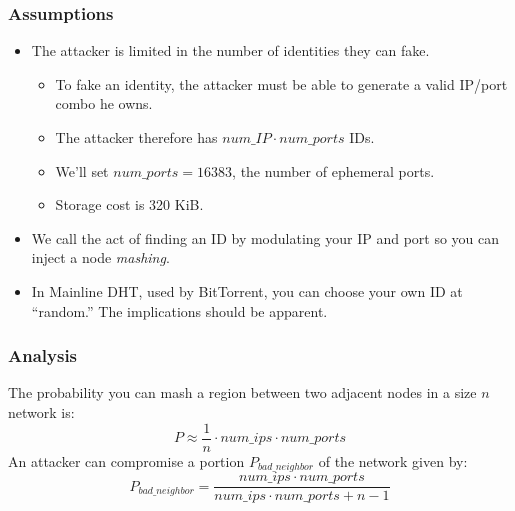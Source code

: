 \documentclass[11pt]{beamer}
\begin{document}
\begin{frame}
\frametitle{Assumptions}
	\begin{itemize}
		\item The attacker is limited in the number of identities they can fake.		
		\begin{itemize}
			\item To fake an identity, the attacker must be able to generate a valid IP/port combo he owns.
			\item The attacker therefore has $num\_IP \cdot num\_ports$ IDs.
			\item We'll set $ num\_ports = 16383 $, the number of ephemeral ports.
			\item Storage cost is 320 KiB.
		\end{itemize}
		\item We call the act of finding an ID by modulating your IP and port so you can inject a node \emph{mashing}.
		\item In Mainline DHT, used by BitTorrent, you can choose your own ID at ``random.''   The implications should be apparent.
	
	\end{itemize}
\end{frame}

\begin{frame}
    \frametitle{Analysis}
    The probability you can mash a region between two adjacent nodes in a size $n$ network is:
     \begin{equation}
    P \approx \frac{1}{n}\cdot num\_ips \cdot num\_ports
    \end{equation}
    An attacker can compromise a portion $ P_{bad\_neighbor} $ of the network given by:
    \begin{equation}
    P_{bad\_neighbor} =  \frac{num\_ips \cdot num\_ports}{num\_ips \cdot num\_ports + n - 1}
    \label{eq:bad}
    \end{equation}
    
\end{frame}
\end{document}
